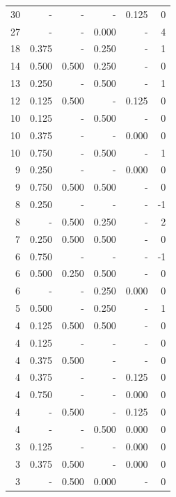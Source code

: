 \documentclass[a4paper]{article}\usepackage{graphicx, color}
\begin{document}
\begin{table}[ht]
\begin{tabular}{rrrrrr}
   \rowcolor{nullColor} 30 & - & - & - & 0.125 & 0 \\ 
   \rowcolor{sosoColor} 27 & - & - & 0.000 & - & 4 \\ 
   \rowcolor{sosoColor} 18 & 0.375 & - & 0.250 & - & 1 \\ 
   \rowcolor{badColor} 14 & 0.500 & 0.500 & 0.250 & - & 0 \\ 
   \rowcolor{sosoColor} 13 & 0.250 & - & 0.500 & - & 1 \\ 
  12 & 0.125 & 0.500 & - & 0.125 & 0 \\ 
   \rowcolor{sosoColor} 10 & 0.125 & - & 0.500 & - & 0 \\ 
   \rowcolor{nullColor} 10 & 0.375 & - & - & 0.000 & 0 \\ 
   \rowcolor{sosoColor} 10 & 0.750 & - & 0.500 & - & 1 \\ 
   \rowcolor{nullColor} 9 & 0.250 & - & - & 0.000 & 0 \\ 
   \rowcolor{goodColor} 9 & 0.750 & 0.500 & 0.500 & - & 0 \\ 
   \rowcolor{nullColor} 8 & 0.250 & - & - & - & -1 \\ 
   \rowcolor{badColor} 8 & - & 0.500 & 0.250 & - & 2 \\ 
   \rowcolor{goodColor} 7 & 0.250 & 0.500 & 0.500 & - & 0 \\ 
   \rowcolor{nullColor} 6 & 0.750 & - & - & - & -1 \\ 
   \rowcolor{badColor} 6 & 0.500 & 0.250 & 0.500 & - & 0 \\ 
   \rowcolor{sosoColor} 6 & - & - & 0.250 & 0.000 & 0 \\ 
   \rowcolor{sosoColor} 5 & 0.500 & - & 0.250 & - & 1 \\ 
   \rowcolor{goodColor} 4 & 0.125 & 0.500 & 0.500 & - & 0 \\ 
   \rowcolor{nullColor} 4 & 0.125 & - & - & - & 0 \\ 
  4 & 0.375 & 0.500 & - & - & 0 \\ 
   \rowcolor{nullColor} 4 & 0.375 & - & - & 0.125 & 0 \\ 
   \rowcolor{nullColor} 4 & 0.750 & - & - & 0.000 & 0 \\ 
  4 & - & 0.500 & - & 0.125 & 0 \\ 
   \rowcolor{sosoColor} 4 & - & - & 0.500 & 0.000 & 0 \\ 
   \rowcolor{nullColor} 3 & 0.125 & - & - & 0.000 & 0 \\ 
  3 & 0.375 & 0.500 & - & 0.000 & 0 \\ 
   \rowcolor{badColor} 3 & - & 0.500 & 0.000 & - & 0 \\ 

\end{tabular}
\end{table}
\end{document}
